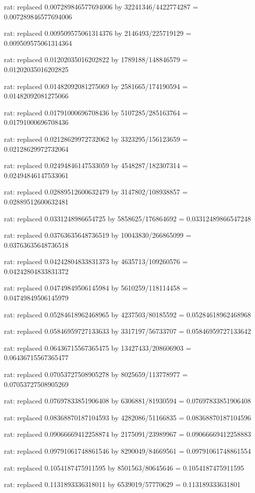 \documentclass[a4paper,10pt]{article}
\begin{document}
\begin{eulernotebook}
\begin{eulercomment}
\begin{eulercomment}
\begin{eulercomment}
\begin{eulercomment}
\begin{eulercomment}
\begin{eulercomment}
\begin{eulercomment}
\begin{eulercomment}
\begin{eulercomment}
\begin{eulercomment}
\begin{eulercomment}
\begin{eulercomment}
\begin{eulercomment}
\begin{eulercomment}
\begin{eulercomment}
\begin{eulercomment}
\begin{euleroutput}
  rat: replaced 0.007289846577694006 by 32241346/4422774287 = 0.007289846577694006
  
  rat: replaced 0.009509575061314376 by 2146493/225719129 = 0.009509575061314364
  
  rat: replaced 0.01202035016202822 by 1789188/148846579 = 0.01202035016202825
  
  rat: replaced 0.01482092081275069 by 2581665/174190594 = 0.01482092081275066
  
  rat: replaced 0.01791000696708436 by 5107285/285163764 = 0.01791000696708436
  
  rat: replaced 0.02128629972732062 by 3323295/156123659 = 0.02128629972732064
  
  rat: replaced 0.02494846147533059 by 4548287/182307314 = 0.02494846147533061
  
  rat: replaced 0.02889512600632479 by 3147802/108938857 = 0.02889512600632481
  
  rat: replaced 0.0331248986654725 by 5858625/176864692 = 0.03312489866547248
  
  rat: replaced 0.03763635648736519 by 10043830/266865099 = 0.03763635648736518
  
  rat: replaced 0.04242804833831373 by 4635713/109260576 = 0.04242804833831372
  
  rat: replaced 0.04749849506145984 by 5610259/118114458 = 0.04749849506145979
  
  rat: replaced 0.05284618962468965 by 4237503/80185592 = 0.05284618962468968
  
  rat: replaced 0.05846959727133633 by 3317197/56733707 = 0.05846959727133642
  
  rat: replaced 0.06436715567365475 by 13427433/208606903 = 0.06436715567365477
  
  rat: replaced 0.07053727508905278 by 8025659/113778977 = 0.07053727508905269
  
  rat: replaced 0.07697833851906408 by 6306881/81930594 = 0.07697833851906408
  
  rat: replaced 0.08368870187104593 by 4282086/51166835 = 0.08368870187104596
  
  rat: replaced 0.09066669412258874 by 2175091/23989967 = 0.09066669412258883
  
  rat: replaced 0.09791061748861546 by 8290049/84669561 = 0.09791061748861554
  
  rat: replaced 0.1054187475911595 by 8501563/80645646 = 0.1054187475911595
  
  rat: replaced 0.1131893336318011 by 6539019/57770629 = 0.113189333631801
  

\end{euleroutput}
\end{eulercomment}
\end{eulercomment}
\end{eulercomment}
\end{eulercomment}
\end{eulercomment}
\end{eulercomment}
\end{eulercomment}
\end{eulercomment}
\end{eulercomment}
\end{eulercomment}
\end{eulercomment}
\end{eulercomment}
\end{eulercomment}
\end{eulercomment}
\end{eulercomment}
\end{eulercomment}
\end{eulernotebook}
\end{document}
